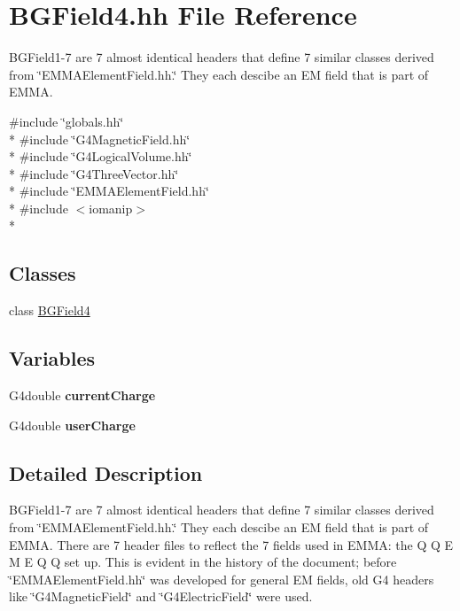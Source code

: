 \hypertarget{BGField4_8hh}{\section{B\-G\-Field4.\-hh File Reference}
\label{BGField4_8hh}
}


B\-G\-Field1-\/7 are 7 almost identical headers that define 7 similar classes derived from \char`\"{}\-E\-M\-M\-A\-Element\-Field.\-hh.\char`\"{} They each descibe an E\-M field that is part of E\-M\-M\-A.  


{\ttfamily \#include \char`\"{}globals.\-hh\char`\"{}}\\*
{\ttfamily \#include \char`\"{}G4\-Magnetic\-Field.\-hh\char`\"{}}\\*
{\ttfamily \#include \char`\"{}G4\-Logical\-Volume.\-hh\char`\"{}}\\*
{\ttfamily \#include \char`\"{}G4\-Three\-Vector.\-hh\char`\"{}}\\*
{\ttfamily \#include \char`\"{}E\-M\-M\-A\-Element\-Field.\-hh\char`\"{}}\\*
{\ttfamily \#include $<$iomanip$>$}\\*
\subsection*{Classes}
\begin{DoxyCompactItemize}
\item 
class \hyperlink{classBGField4}{B\-G\-Field4}
\end{DoxyCompactItemize}
\subsection*{Variables}
\begin{DoxyCompactItemize}
\item 
\hypertarget{BGField4_8hh_acb265d8eecfa1acd31056f0c7915362e}{G4double {\bfseries current\-Charge}}\label{BGField4_8hh_acb265d8eecfa1acd31056f0c7915362e}

\item 
\hypertarget{BGField4_8hh_a2d61cdd1b1b5ed409f7c91b54737c1b9}{G4double {\bfseries user\-Charge}}\label{BGField4_8hh_a2d61cdd1b1b5ed409f7c91b54737c1b9}

\end{DoxyCompactItemize}


\subsection{Detailed Description}
B\-G\-Field1-\/7 are 7 almost identical headers that define 7 similar classes derived from \char`\"{}\-E\-M\-M\-A\-Element\-Field.\-hh.\char`\"{} They each descibe an E\-M field that is part of E\-M\-M\-A. There are 7 header files to reflect the 7 fields used in E\-M\-M\-A\-: the Q Q E M E Q Q set up. This is evident in the history of the document; before \char`\"{}\-E\-M\-M\-A\-Element\-Field.\-hh\char`\"{} was developed for general E\-M fields, old G4 headers like \char`\"{}\-G4\-Magnetic\-Field\char`\"{} and \char`\"{}\-G4\-Electric\-Field\char`\"{} were used. 